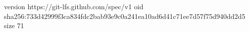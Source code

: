 version https://git-lfs.github.com/spec/v1
oid sha256:733d42999f3ca834fdc2bab93e9c0a241ea10ad6d41c71ee7d57f75d940dd2d5
size 71

